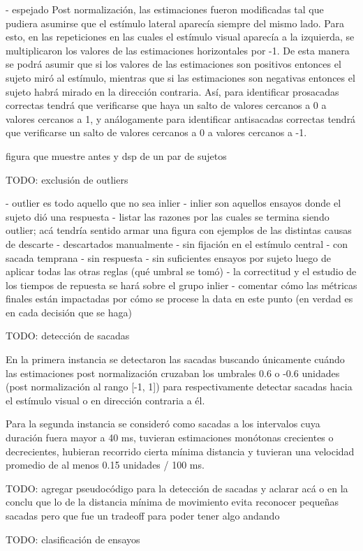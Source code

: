   - espejado
  Post normalización, las estimaciones fueron modificadas tal que pudiera
  asumirse que el estímulo lateral aparecía siempre del mismo lado.
  Para esto, en las repeticiones en las cuales el estímulo visual aparecía a la
  izquierda, se multiplicaron los valores de las estimaciones horizontales por
  -1.
  De esta manera se podrá asumir que si los valores de las estimaciones son
  positivos entonces el sujeto miró al estímulo, mientras que si las estimaciones
  son negativas entonces el sujeto habrá mirado en la dirección contraria.
  Así, para identificar prosacadas correctas tendrá que verificarse que haya un
  salto de valores cercanos a 0 a valores cercanos a 1, y análogamente para
  identificar antisacadas correctas tendrá que verificarse un salto de valores
  cercanos a 0 a valores cercanos a -1.

  figura que muestre antes y dsp de un par de sujetos

  TODO: exclusión de outliers

  - outlier es todo aquello que no sea inlier
  - inlier son aquellos ensayos donde el sujeto dió una respuesta 
  - listar las razones por las cuales se termina siendo outlier; acá tendría
  sentido armar una figura con ejemplos de las distintas causas de descarte
   - descartados manualmente
   - sin fijación en el estímulo central
   - con sacada temprana
   - sin respuesta
   - sin suficientes ensayos por sujeto luego de aplicar todas las otras reglas
   (qué umbral se tomó)
  - la correctitud y el estudio de los tiempos de repuesta se hará sobre el
    grupo inlier
  - comentar cómo las métricas finales están impactadas por cómo se procese la
    data en este punto (en verdad es en cada decisión que se haga)

  TODO: detección de sacadas

  En la primera instancia se detectaron las sacadas buscando únicamente cuándo
  las estimaciones post normalización cruzaban los umbrales 0.6 o -0.6 unidades
  (post normalización al rango [-1, 1]) para respectivamente detectar sacadas
  hacia el estímulo visual o en dirección contraria a él.

  Para la segunda instancia se consideró como sacadas a los intervalos cuya
  duración fuera mayor a 40 ms, tuvieran estimaciones monótonas crecientes o
  decrecientes, hubieran recorrido cierta mínima distancia y tuvieran una
  velocidad promedio de al menos 0.15 unidades / 100 ms.

  TODO: agregar pseudocódigo para la detección de sacadas y aclarar acá o en la
        conclu que lo de la distancia mínima de movimiento evita reconocer
        pequeñas sacadas pero que fue un tradeoff para poder tener algo andando


  TODO: clasificación de ensayos
